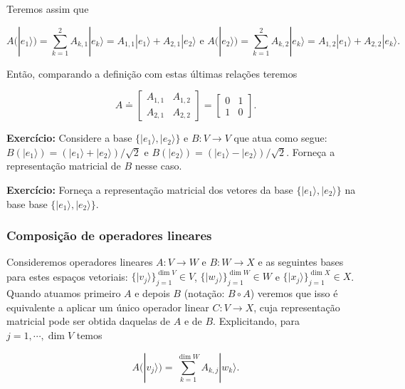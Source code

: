 \documentclass[11pt]{article}
\begin{document}
Teremos assim que

\begin{equation}
A(|e_{1}\rangle)=\sum_{k=1}^{2}A_{k,1}|e_{k}\rangle = A_{1,1}|e_{1}\rangle+ A_{2,1}|e_{2}\rangle \text{ e } A(|e_{2}\rangle)=\sum_{k=1}^{2}A_{k,2}|e_{k}\rangle = A_{1,2}|e_{1}\rangle+ A_{2,2}|e_{k}\rangle.
\end{equation}

Então, comparando a definição com estas últimas relações teremos

\begin{equation}
A \doteq \begin{bmatrix} A_{1,1} & A_{1,2} \\ A_{2,1} & A_{2,2} \end{bmatrix} = \begin{bmatrix} 0 & 1 \\ 1 & 0 \end{bmatrix}.
\end{equation}

\textbf{Exercício:} Considere a base \(\{|e_{1}\rangle,|e_{2}\rangle\}\)
e \(B:V\rightarrow V\) que atua como segue:
\(B(|e_{1}\rangle)=(|e_{1}\rangle+|e_{2}\rangle)/\sqrt{2}\) e
\(B(|e_{2}\rangle)=(|e_{1}\rangle-|e_{2}\rangle)/\sqrt{2}\). Forneça a
representação matricial de \(B\) nesse caso.

\textbf{Exercício:} Forneça a representação matricial dos vetores da
base \(\{|e_{1}\rangle,|e_{2}\rangle\}\) na base base
\(\{|e_{1}\rangle,|e_{2}\rangle\}\).

    \subsubsection{Composição de operadores
lineares}\label{composiuxe7uxe3o-de-operadores-lineares}

Consideremos operadores lineares \(A:V\rightarrow W\) e
\(B:W\rightarrow X\) e as seguintes bases para estes espaços vetoriais:
\(\{|v_{j}\rangle\}_{j=1}^{\dim V}\in V\),
\(\{|w_{j}\rangle\}_{j=1}^{\dim W}\in W\) e
\(\{|x_{j}\rangle\}_{j=1}^{\dim X}\in X\). Quando atuamos primeiro \(A\)
e depois \(B\) (notação: \(B\circ A\)) veremos que isso é equivalente a
aplicar um único operador linear \(C:V\rightarrow X\), cuja
representação matricial pode ser obtida daquelas de \(A\) e de \(B\).
Explicitando, para \(j=1,\cdots,\dim V\) temos

\begin{equation}
A(|v_{j}\rangle) = \sum_{k=1}^{\dim W} A_{k,j}|w_{k}\rangle.
\end{equation}
\end{document}
